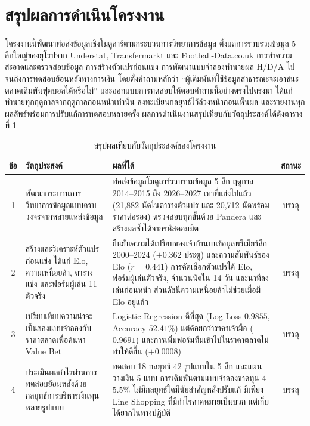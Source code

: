 
\section{สรุปผลการดำเนินโครงงาน}

โครงงานนี้พัฒนาท่อส่งข้อมูลเชิงโมดูลาร์ตามกระบวนการวิทยาการข้อมูล ตั้งแต่การรวบรวมข้อมูล 5 ลีกใหญ่ของยุโรปจาก Understat, Transfermarkt และ Football-Data.co.uk การทำความสะอาดและตรวจสอบข้อมูล การสร้างตัวแปรก่อนแข่ง การพัฒนาแบบจำลองทำนายผล H/D/A ไปจนถึงการทดสอบย้อนหลังทางการเงิน โดยตั้งคำถามหลักว่า ``ผู้เดิมพันที่ใช้ข้อมูลสาธารณะจะเอาชนะตลาดเดิมพันฟุตบอลได้หรือไม่'' และออกแบบการทดสอบให้ตอบคำถามนี้อย่างตรงไปตรงมา ได้แก่ ทำนายทุกฤดูกาลจากฤดูกาลก่อนหน้าเท่านั้น ลงทะเบียนกลยุทธ์ไว้ล่วงหน้าก่อนเห็นผล และรายงานทุกผลลัพธ์พร้อมการปรับแก้การทดสอบหลายครั้ง ผลการดำเนินงานสรุปเทียบกับวัตถุประสงค์ได้ดังตารางที่ \ref{tab:obj_result}

\begin{table}[htbp]
\centering
\caption{สรุปผลเทียบกับวัตถุประสงค์ของโครงงาน}
\label{tab:obj_result}
\begin{tabular}{|c|>{\raggedright\arraybackslash}p{4.2cm}|>{\raggedright\arraybackslash}p{6.6cm}|c|}
\hline
\textbf{ข้อ} & \textbf{วัตถุประสงค์} & \textbf{ผลที่ได้} & \textbf{สถานะ} \\
\hline
1 & พัฒนากระบวนการวิทยาการข้อมูลแบบครบวงจรจากหลายแหล่งข้อมูล & ท่อส่งข้อมูลโมดูลาร์รวบรวมข้อมูล 5 ลีก ฤดูกาล 2014--2015 ถึง 2026--2027 เท่าที่แข่งไปแล้ว (21,882 นัดในตารางตัวแปร และ 20,712 นัดพร้อมราคาต่อรอง) ตรวจสอบทุกขั้นด้วย Pandera และสร้างผลซ้ำได้จากรหัสคอมมิต & บรรลุ \\ \hline
2 & สร้างและวิเคราะห์ตัวแปรก่อนแข่ง ได้แก่ Elo, ความเหนื่อยล้า, ตารางแข่ง และฟอร์มผู้เล่น 11 ตัวจริง & ยืนยันความได้เปรียบของเจ้าบ้านบนข้อมูลพรีเมียร์ลีก 2000--2024 ($+0.362$ ประตู) และความสัมพันธ์ของ Elo ($r = 0.441$) การคัดเลือกตัวแปรได้ Elo, ฟอร์มผู้เล่นตัวจริง, จำนวนนัดใน 14 วัน และนาทีลงเล่นก่อนหน้า ส่วนดัชนีความเหนื่อยล้าไม่ช่วยเมื่อมี Elo อยู่แล้ว & บรรลุ \\ \hline
3 & เปรียบเทียบความน่าจะเป็นของแบบจำลองกับราคาตลาดเพื่อค้นหา Value Bet & Logistic Regression ดีที่สุด (Log Loss $0.9855$, Accuracy $52.41\%$) แต่ด้อยกว่าราคาเจ้ามือ ($0.9691$) และการเพิ่มฟอร์มทีมเข้าไปในราคาตลาดไม่ทำให้ดีขึ้น ($+0.0008$) & บรรลุ \\ \hline
4 & ประเมินผลกำไรผ่านการทดสอบย้อนหลังด้วยกลยุทธ์การบริหารเงินทุนหลายรูปแบบ & ทดสอบ 18 กลยุทธ์ 42 รูปแบบใน 5 ลีก และแผนวางเงิน 5 แบบ การเดิมพันตามแบบจำลองขาดทุน $4$--$5.5\%$ ไม่มีกลยุทธ์ใดมีนัยสำคัญหลังปรับแก้ มีเพียง Line Shopping ที่มีกำไรคาดหมายเป็นบวก แต่เก็บได้ยากในทางปฏิบัติ & บรรลุ \\
\hline
\end{tabular}
\end{table}

